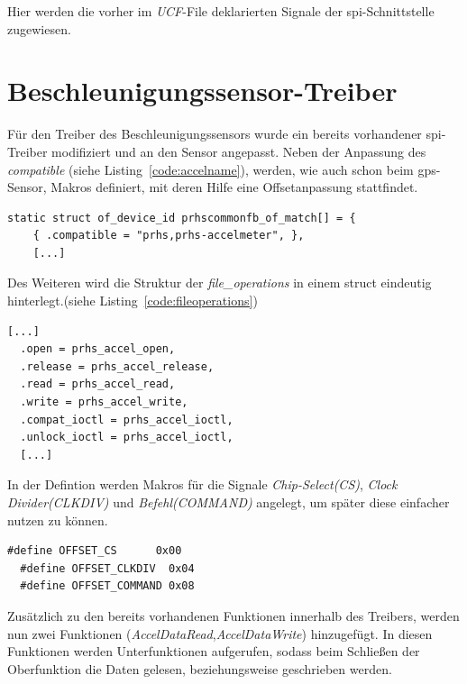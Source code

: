 Hier werden die vorher im \emph{UCF}-File deklarierten Signale der \ac{spi}-Schnittstelle zugewiesen.

\section{Beschleunigungssensor-Treiber}\label{kap:acceltreiber}

Für den Treiber des Beschleunigungssensors wurde ein bereits vorhandener \ac{spi}-Treiber modifiziert und
an den Sensor angepasst. Neben der Anpassung des \emph{compatible} (siehe Listing~\ref{code:accelname}), werden,
wie auch schon beim \ac{gps}-Sensor, Makros definiert, mit deren Hilfe eine Offsetanpassung stattfindet.\\

\begin{lstlisting}[caption={Anpassung des Compatible innerhalb des Treibers},label={code:accelname}]
  static struct of_device_id prhscommonfb_of_match[] = {
  	{ .compatible = "prhs,prhs-accelmeter", },
  	[...]
\end{lstlisting}

Des Weiteren wird die Struktur der \emph{file\_operations} in einem struct eindeutig hinterlegt.(siehe Listing~\ref{code:fileoperations})\\
\begin{lstlisting}[caption={\emph{file\_operations}-Struct},label={code:fileoperations}]
  [...]
  .open = prhs_accel_open,
  .release = prhs_accel_release,
  .read = prhs_accel_read,
  .write = prhs_accel_write,
  .compat_ioctl = prhs_accel_ioctl,
  .unlock_ioctl = prhs_accel_ioctl,
  [...]
 \end{lstlisting}

In der Defintion werden Makros für die Signale \emph{Chip-Select(CS)}, \emph{Clock Divider(CLKDIV)} und \emph{Befehl(COMMAND)}
angelegt, um später diese einfacher nutzen zu können.\\

\begin{lstlisting}[caption={Definition von Makros},label={code:makrosdif}]
  #define OFFSET_CS      0x00
  #define OFFSET_CLKDIV  0x04
  #define OFFSET_COMMAND 0x08
 \end{lstlisting}

Zusätzlich zu den bereits vorhandenen Funktionen innerhalb des Treibers, werden nun
zwei Funktionen (\emph{AccelDataRead},\emph{AccelDataWrite}) hinzugefügt. In diesen Funktionen werden Unterfunktionen
aufgerufen, sodass beim Schließen der Oberfunktion die Daten gelesen, beziehungsweise geschrieben werden.\\

